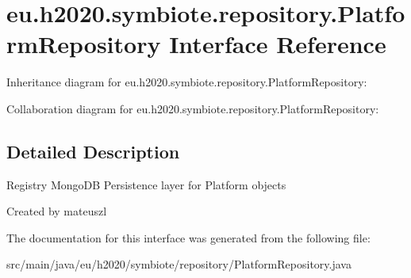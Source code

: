 \hypertarget{interfaceeu_1_1h2020_1_1symbiote_1_1repository_1_1PlatformRepository}{}\section{eu.\+h2020.\+symbiote.\+repository.\+Platform\+Repository Interface Reference}
\label{interfaceeu_1_1h2020_1_1symbiote_1_1repository_1_1PlatformRepository}


Inheritance diagram for eu.\+h2020.\+symbiote.\+repository.\+Platform\+Repository\+:


Collaboration diagram for eu.\+h2020.\+symbiote.\+repository.\+Platform\+Repository\+:


\subsection{Detailed Description}
Registry Mongo\+DB Persistence layer for Platform objects

Created by mateuszl 

The documentation for this interface was generated from the following file\+:\begin{DoxyCompactItemize}
\item 
src/main/java/eu/h2020/symbiote/repository/Platform\+Repository.\+java\end{DoxyCompactItemize}
